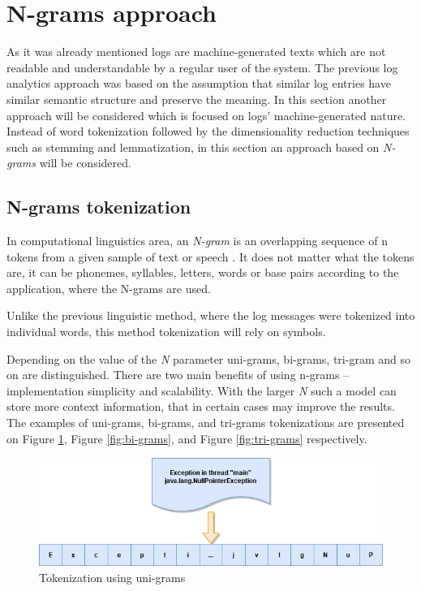 \documentclass[thesis=M,english]{FITthesis}[2019/12/23]
\begin{document}
\section{N-grams approach}\label{sect:n-grams-approach}
As it was already mentioned logs are machine-generated texts which are not readable and understandable by a regular user of the system. The previous log analytics approach was based on the assumption that similar log entries have similar semantic structure and preserve the meaning. In this section another approach will be considered which is focused on logs' machine-generated nature. Instead of word tokenization followed by the dimensionality reduction techniques such as stemming and lemmatization, in this section an approach based on \textit{N-grams} will be considered.

\subsection{N-grams tokenization}
In computational linguistics area, an \textit{N-gram} is an overlapping sequence of n tokens from a given sample of text or speech \cite{n-grams-wiki}. It does not matter what the tokens are, it can be phonemes, syllables, letters, words or base pairs according to the application, where the N-grams are used. 

Unlike the previous linguistic method, where the log messages were tokenized into individual words, this method tokenization will rely on symbols.

Depending on the value of the \textit{N} parameter uni-grams, bi-grams, tri-gram and so on are distinguished. There are two main benefits of using n-grams -- implementation simplicity and scalability. With the larger \textit{N} such a model can store more context information, that in certain cases may improve the results. The examples of uni-grams, bi-grams, and tri-grams tokenizations are presented on Figure \ref{fig:uni-grams}, Figure \ref{fig:bi-grams}, and Figure \ref{fig:tri-grams} respectively.

\begin{figure}[h!]\centering
	\includegraphics[scale=0.48]{uni_grams}
	\caption{Tokenization using uni-grams}\label{fig:uni-grams}
\end{figure}
\end{document}
